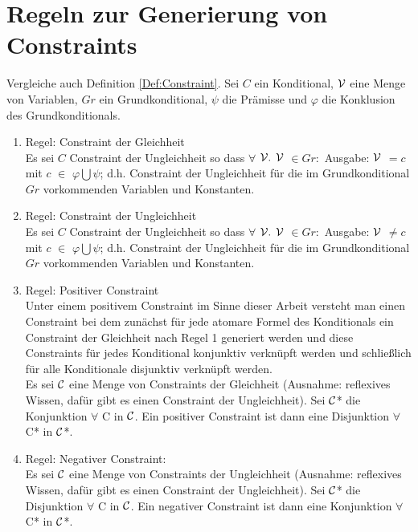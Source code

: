 \documentclass[a4paper, 11pt]{book}
\begin{document}
\section{Regeln zur Generierung von Constraints}\label{Reg} 
Vergleiche auch Definition \ref{Def:Constraint}.
Sei $ C $ ein Konditional, $ \cal{V} $ eine Menge von Variablen, $ Gr $ ein Grundkonditional, $ \psi $ die Prämisse und $ \varphi $ die Konklusion des Grundkonditionals.
\begin{enumerate}
	\item \label{Reg1} Regel: Constraint der Gleichheit\\
	Es sei $ C $ Constraint der Ungleichheit so dass $\forall $  $\cal{V.}$  $ \cal{V}$  $ \in Gr :$ Ausgabe:  $ \cal{V}  $ $ = c $ mit $ c $  $ \in $ $ \varphi \bigcup \psi$; d.h. Constraint der Ungleichheit für die im Grundkonditional  $ Gr $ vorkommenden Variablen und Konstanten.
	
	\item \label{Reg2} Regel: Constraint der Ungleichheit\\
	Es sei $ C $ Constraint der Ungleichheit so dass $\forall $  $\cal{V.}$  $ \cal{V}$  $ \in Gr :$ Ausgabe:  $ \cal{V}  $ $ \neq c $ mit $ c $  $ \in $ $ \varphi \bigcup \psi$; d.h. Constraint der Ungleichheit für die im Grundkonditional  $ Gr $ vorkommenden Variablen und Konstanten.
	\item \label{Reg3} Regel: Positiver Constraint\\
	Unter einem positivem Constraint im Sinne dieser Arbeit versteht man einen Constraint bei dem zunächst für jede atomare Formel des Konditionals ein Constraint der Gleichheit nach Regel 1 generiert werden und diese Constraints für jedes Konditional konjunktiv verknüpft werden und schließlich für alle Konditionale disjunktiv verknüpft werden.\\
	Es sei $ \cal {C} $ eine Menge von Constraints der Gleichheit (Ausnahme: reflexives Wissen, dafür gibt es einen Constraint der Ungleichheit). Sei $ \cal{C} $* die Konjunktion $ \forall $  C in $\cal {C}  $. Ein positiver Constraint ist dann eine Disjunktion $ \forall $ C* in $ \cal{C} $*.
	
	\item \label{Reg4} Regel: Negativer Constraint:\\
		Es sei $ \cal {C} $ eine Menge von Constraints der Ungleichheit (Ausnahme: reflexives Wissen, dafür gibt es einen Constraint der Ungleichheit). Sei $ \cal{C} $* die Disjunktion $ \forall $  C in $\cal {C}  $. Ein negativer Constraint ist dann eine Konjunktion $ \forall $ C* in $ \cal{C} $*.
	
	
	
\end{enumerate}
\end{document}
